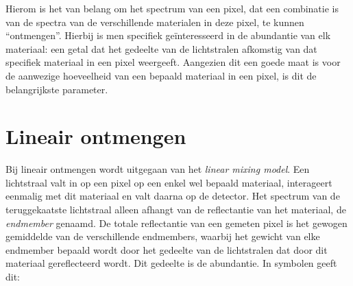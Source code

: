 \documentclass[12pt]{report}
\begin{document}
Hierom is het van belang om het spectrum van een pixel, dat een combinatie is van de spectra van de verschillende materialen in deze pixel, te kunnen ``ontmengen''. Hierbij is men specifiek ge\"interesseerd in de abundantie van elk materiaal: een getal dat het gedeelte van de lichtstralen afkomstig van dat specifiek materiaal in een pixel weergeeft. Aangezien dit een goede maat is voor de aanwezige hoeveelheid van een bepaald materiaal in een pixel, is dit de belangrijkste parameter.

%
%






\section{Lineair ontmengen}

Bij lineair ontmengen wordt uitgegaan van het \textit{linear mixing model}. Een lichtstraal valt in op een pixel op een enkel wel bepaald materiaal, interageert eenmalig met dit materiaal en valt daarna op de detector. Het spectrum van de teruggekaatste lichtstraal alleen afhangt van de reflectantie van het materiaal, de \textit{endmember} genaamd. De totale reflectantie van een gemeten pixel is het gewogen gemiddelde van de verschillende endmembers, waarbij het gewicht van elke endmember bepaald wordt door het gedeelte van de lichtstralen dat door dit materiaal gereflecteerd wordt. Dit gedeelte is de abundantie. In symbolen geeft dit:
\end{document}
